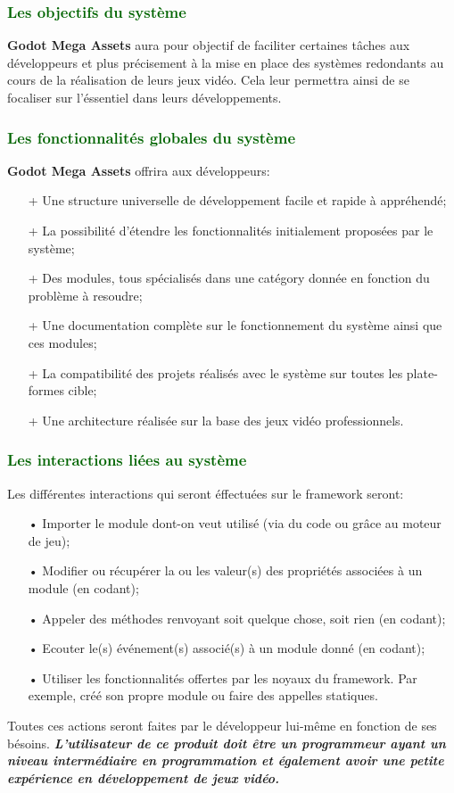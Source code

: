 \documentclass[ebook, 8pt, oneside, openany]{memoir}
\begin{document}
	\subsubsection{\textcolor{darkgreen}{Les objectifs du système}}
	\textbf{Godot Mega Assets} aura pour objectif de faciliter certaines tâches aux développeurs et plus
	précisement à la mise en place des systèmes redondants au cours de la réalisation de leurs jeux vidéo.
	Cela leur permettra ainsi de se focaliser sur l'éssentiel dans leurs développements.
	\subsubsection{\textcolor{darkgreen}{Les fonctionnalités globales du système}}
	\textbf{Godot Mega Assets} offrira aux développeurs:
	\begin{itemize}
		\item[+] Une structure universelle de développement facile et rapide à appréhendé;
		\item[+] La possibilité d'étendre les fonctionnalités initialement proposées par le système;
		\item[+] Des modules, tous spécialisés dans une catégory donnée en fonction du problème à resoudre;
		\item[+] Une documentation complète sur le fonctionnement du système ainsi que ces modules;
		\item[+] La compatibilité des projets réalisés avec le système sur toutes les plate-formes cible;
		\item[+] Une architecture réalisée sur la base des jeux vidéo professionnels.
	\end{itemize}
	\subsubsection{\textcolor{darkgreen}{Les interactions liées au système}}
	Les différentes interactions qui seront éffectuées sur le framework seront:
	\begin{itemize}
		\item[•] Importer le module dont-on veut utilisé (via du code ou grâce au moteur de jeu);
		\item[•] Modifier ou récupérer la ou les valeur(s) des propriétés associées à un module (en codant);
		\item[•] Appeler des méthodes renvoyant soit quelque chose, soit rien (en codant);
		\item[•] Ecouter le(s) événement(s) associé(s) à un module donné (en codant);
		\item[•] Utiliser les fonctionnalités offertes par les noyaux du framework. Par exemple, créé son
		propre module ou faire des appelles statiques.
	\end{itemize}
	Toutes ces actions seront faites par le développeur lui-même en fonction de ses bésoins.
	\textbf{\textit{L'utilisateur de ce produit doit être un programmeur ayant un niveau intermédiaire en
	programmation et également avoir une petite expérience en développement de jeux vidéo.}}
\end{document}
